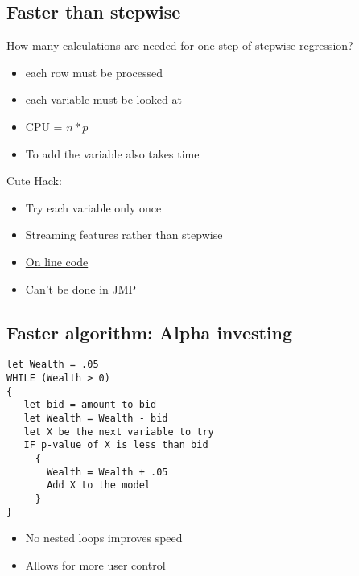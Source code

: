 \documentclass[12pt]{extarticle} %
\begin{document}
\subsection{Faster than stepwise}

How many calculations are needed for one step of stepwise regression? 
\begin{itemize}
\item each row must be processed
\item each variable must be looked at
\item CPU = $n * p$
\item To add the variable also takes time
\end{itemize}
Cute Hack:
\begin{itemize}
\item Try each variable only once
\item Streaming features rather than stepwise
\item \href{http://gosset.wharton.upenn.edu/~foster/auction.html}{On line code}
\item Can't be done in JMP
\end{itemize}

\newpage
\subsection{Faster algorithm: Alpha investing}

\begin{verbatim}
let Wealth = .05
WHILE (Wealth > 0)
{
   let bid = amount to bid
   let Wealth = Wealth - bid
   let X be the next variable to try
   IF p-value of X is less than bid
     {
       Wealth = Wealth + .05
       Add X to the model
     }
}
\end{verbatim}
\begin{itemize}
\item No nested loops improves speed 
\item Allows for more user control
\end{itemize}
\end{document}
